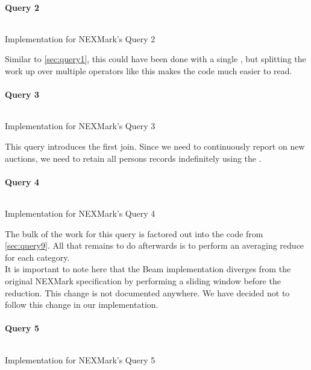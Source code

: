 \paragraph{Query 2}
\begin{listing}[H]
  \inputminted[firstline=459,lastline=462]{rust}{benchmarks/src/nexmark.rs}
  \caption{Implementation for NEXMark's Query 2}
  \label{lst:nexmark-query2}
\end{listing}

Similar to \autoref{sec:query1}, this could have been done with a single , but splitting the work up over multiple operators like this makes the code much easier to read.

\paragraph{Query 3}
\begin{listing}[H]
  \inputminted[firstline=493,lastline=502]{rust}{benchmarks/src/nexmark.rs}
  \caption{Implementation for NEXMark's Query 3}
  \label{lst:nexmark-query3}
\end{listing}

This query introduces the first join. Since we need to continuously report on new auctions, we need to retain all persons records indefinitely using the .

\paragraph{Query 4}\label{sec:query4}
\begin{listing}[H]
  \inputminted[firstline=533,lastline=534]{rust}{benchmarks/src/nexmark.rs}
  \caption{Implementation for NEXMark's Query 4}
  \label{lst:nexmark-query4}
\end{listing}

The bulk of the work for this query is factored out into the code from \autoref{sec:query9}. All that remains to do afterwards is to perform an averaging reduce for each category. \\

It is important to note here that the Beam implementation diverges from the original NEXMark specification by performing a sliding window before the reduction. This change is not documented anywhere. We have decided not to follow this change in our implementation.

\paragraph{Query 5}
\begin{listing}[H]
  \inputminted[firstline=562,lastline=571]{rust}{benchmarks/src/nexmark.rs}
  \caption{Implementation for NEXMark's Query 5}
  \label{lst:nexmark-query5}
\end{listing}


